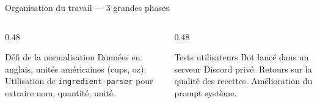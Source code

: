 \documentclass[aspectratio=169]{beamer}
\begin{document}
\begin{frame}{Organisation du travail --- 3 grandes phases}
\begin{center}

\end{center}
\vspace{0.2cm}
\begin{columns}
\begin{column}{0.48\textwidth}
\begin{exampleblock}{\scriptsize D\'efi de la normalisation}
\footnotesize
Donn\'ees en anglais, unit\'es am\'ericaines (cups, oz). Utilisation de \texttt{ingredient-parser} pour extraire nom, quantit\'e, unit\'e.
\end{exampleblock}
\end{column}
\begin{column}{0.48\textwidth}
\begin{exampleblock}{\scriptsize Tests utilisateurs}
\footnotesize
Bot lanc\'e dans un serveur Discord priv\'e. Retours sur la qualit\'e des recettes. Am\'elioration du prompt syst\`eme.
\end{exampleblock}
\end{column}
\end{columns}
\end{frame}

\end{document}
